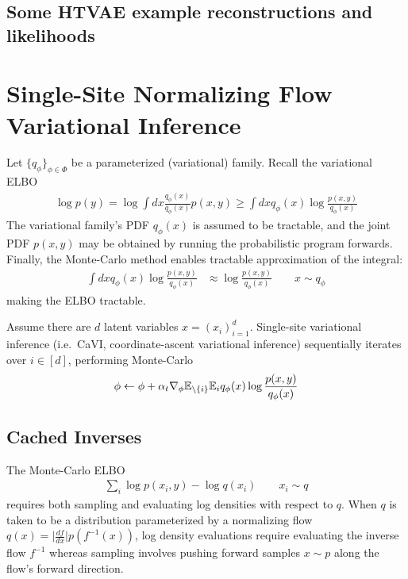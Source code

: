 \documentclass{scrartcl}
\theoremstyle{definition}
\begin{document}

\subsection{Some HTVAE example reconstructions and likelihoods}


\section{Single-Site Normalizing Flow Variational Inference}


Let $\{q_\phi\}_{\phi \in \Phi}$ be a parameterized (variational) family.
Recall the variational ELBO
\begin{align*}
    \log p(y)
    = \log \int dx \frac{q_\phi(x)}{q_\phi(x)} p(x,y)
    \geq \int dx q_\phi(x) \log \frac{p(x,y)}{q_\phi(x)}
\end{align*}
The variational family's PDF $q_\phi(x)$ is assumed to be tractable, and
the joint PDF $p(x,y)$ may be obtained by running the probabilistic program forwards.
Finally, the Monte-Carlo method enables tractable approximation of the integral:
\begin{align*}
    \int dx q_\phi(x) \log \frac{p(x,y)}{q_\phi(x)}
     & \approx \log \frac{p(x,y)}{q_\phi(x)}\qquad x \sim q_\phi
\end{align*}
making the ELBO tractable.

Assume there are $d$ latent variables $x = (x_i)_{i=1}^d$.
Single-site variational inference (i.e.\ CaVI, coordinate-ascent variational
inference) sequentially iterates over $i \in [d]$, performing Monte-Carlo
\begin{align*}
    \phi \leftarrow
    \phi + \alpha_t \nabla_{\phi} \mathbb{E}_{\setminus \{i\}} \mathbb{E}_{i} q_\phi(x) \log \frac{p(x,y)}{q_\phi(x)}
\end{align*}


\subsection{Cached Inverses}

The Monte-Carlo ELBO
\begin{align*}
    \sum_i \log p(x_i, y) - \log q(x_i) \qquad x_i \sim q
\end{align*}
requires both sampling and evaluating log densities with respect to $q$.
When $q$ is taken to be a distribution parameterized by a normalizing flow
$q(x) = \lvert \frac{df}{dx} \rvert p(f^{-1}(x))$, log density evaluations
require evaluating the inverse flow $f^{-1}$ whereas sampling involves
pushing forward samples $x \sim p$ along the flow's forward direction.
\end{document}
